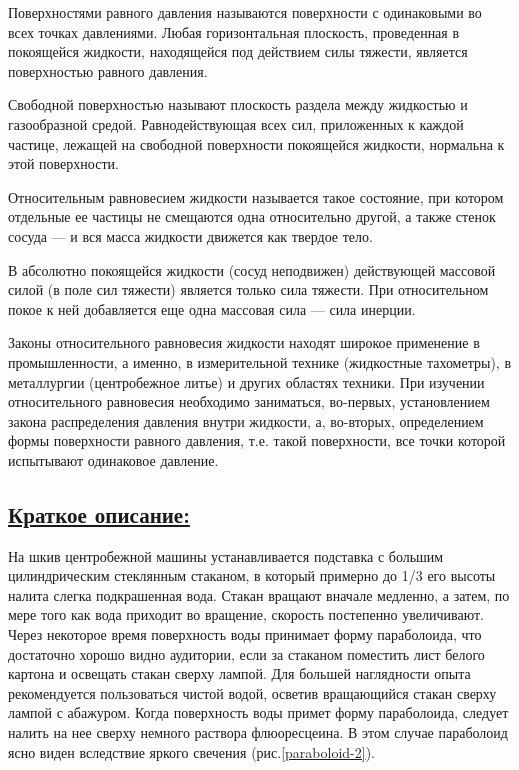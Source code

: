 \documentclass[14pt,a4paper,oneside]{extarticle}	%
\begin{document}
Поверхностями равного давления называются поверхности с одинаковыми во всех точках давлениями.
Любая горизонтальная плоскость, проведенная в покоящейся жидкости, находящейся под действием силы тяжести, является поверхностью равного давления.

Свободной поверхностью называют плоскость раздела между жидкостью и газообразной средой.
Равнодействующая всех сил, приложенных к каждой частице, лежащей на свободной поверхности покоящейся жидкости, нормальна к этой поверхности.

Относительным равновесием жидкости называется такое состояние, при котором отдельные ее частицы не смещаются одна относительно другой, 
а также стенок сосуда — и вся масса жидкости движется как твердое тело.

В абсолютно покоящейся жидкости (сосуд неподвижен) действующей массовой силой (в поле сил тяжести) является только сила тяжести.
При относительном покое к ней добавляется еще одна массовая сила — сила инерции.

Законы относительного равновесия жидкости находят широкое применение в промышленности, а именно, в измерительной технике (жидкостные тахометры), в металлургии (центробежное литье) и других областях техники.
При изучении относительного равновесия необходимо заниматься, во-первых, установлением закона распределения давления внутри жидкости, 
а, во-вторых, определением формы поверхности равного давления, т.е. такой поверхности, все точки которой испытывают одинаковое давление.

\newpage
\subsection*{\underline{Краткое описание:}}

На шкив центробежной машины устанавливается подставка с большим цилиндрическим стеклянным стаканом, 
в который примерно до 1/3 его высоты налита слегка подкрашенная вода.
Стакан вращают вначале медленно, а затем, по мере того как вода приходит во вращение, скорость постепенно увеличивают. 
Через некоторое время поверхность воды принимает форму параболоида, что достаточно хорошо видно аудитории, если за стаканом поместить лист белого картона и освещать стакан сверху лампой. 
Для большей наглядности опыта рекомендуется пользоваться чистой водой, 
осветив вращающийся стакан сверху лампой с абажуром. 
Когда поверхность воды примет форму параболоида, следует налить на нее сверху немного раствора флюоресцеина. 
В этом случае параболоид ясно виден вследствие яркого свечения (рис.\ref{paraboloid-2}).
\end{document}
